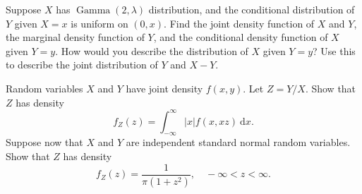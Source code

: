 \documentclass[answers]{exam}
\begin{document}
\begin{questions}



\question%
Suppose $X$ has $\operatorname{Gamma}(2, \lambda)$ distribution, and the conditional distribution of $Y$ given $X=x$ is uniform on $(0, x)$. Find the joint density function of $X$ and $Y$, the marginal density function of $Y$, and the conditional density function of $X$ given $Y=y$. How would you describe the distribution of $X$ given $Y=y$? Use this to describe the joint distribution of $Y$ and $X-Y$.



\question%
Random variables $X$ and $Y$ have joint density $f(x, y)$. Let $Z=Y / X$. Show that $Z$ has density \[
	f_{Z}(z)=\int_{-\infty}^{\infty}|x| f(x, x z) \mathrm{~d} x.
\] Suppose now that $X$ and $Y$ are independent standard normal random variables. Show that $Z$ has density \[
	f_{Z}(z)=\frac{1}{\pi\left(1+z^{2}\right)},\quad -\infty<z<\infty.
\]




\end{questions}
\end{document}
